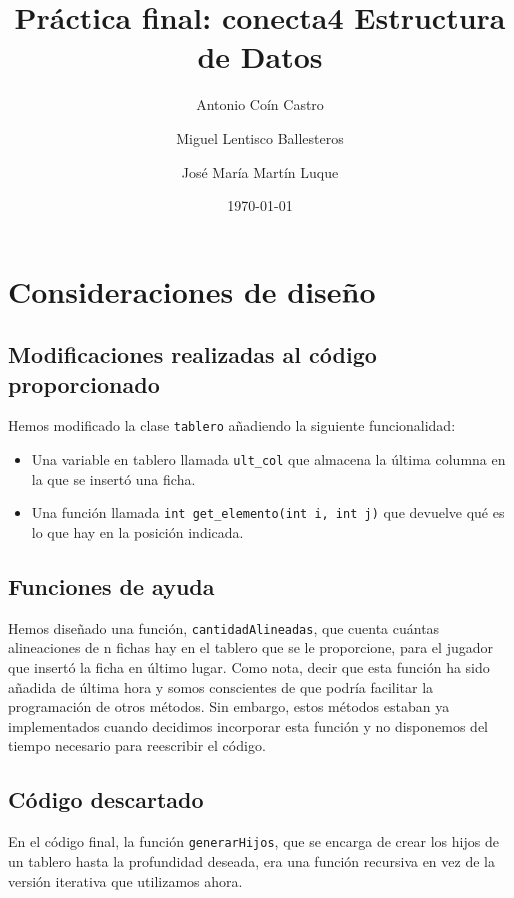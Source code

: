 \documentclass[11pt]{article}
\author{Antonio Coín Castro \and Miguel Lentisco Ballesteros \and José María Martín Luque}
\date{\today}
\title{Práctica final: conecta4 \linebreak Estructura de Datos}
\begin{document}
\maketitle
\tableofcontents



\section{Consideraciones de diseño}
\label{sec-1}

\subsection{Modificaciones realizadas al código proporcionado}
\label{sec-1-1}

Hemos modificado la clase \texttt{tablero} añadiendo la siguiente funcionalidad:

\begin{itemize}
\item Una variable en tablero llamada \texttt{ult\_col} que almacena la última columna en la
que se insertó una ficha.
\item Una función llamada \texttt{int get\_elemento(int i, int j)} que devuelve qué es lo
que hay en la posición indicada.
\end{itemize}

\subsection{Funciones de ayuda}
\label{sec-1-2}

Hemos diseñado una función, \texttt{cantidadAlineadas}, que cuenta cuántas alineaciones
de n fichas hay en el tablero que se le proporcione, para el jugador que insertó
la ficha en último lugar. Como nota, decir que esta función ha sido añadida de
última hora y somos conscientes de que podría facilitar la programación de otros
métodos. Sin embargo, estos métodos estaban ya implementados cuando decidimos
incorporar esta función y no disponemos del tiempo necesario para reescribir el código.

\subsection{Código descartado}
\label{sec-1-3}

En el código final, la función \texttt{generarHijos}, que se encarga de crear los hijos
de un tablero hasta la profundidad deseada, era una función recursiva en vez de
la versión iterativa que utilizamos ahora.
\end{document}
